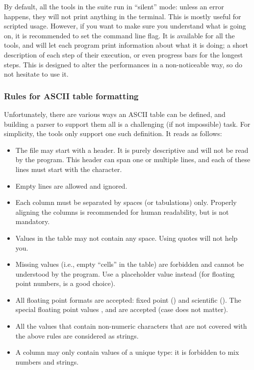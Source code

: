 By default, all the tools in the \egg suite run in ``silent'' mode: unless an error happens, they will not print anything in the terminal. This is mostly useful for scripted usage. However, if you want to make sure you understand what is going on, it is recommended to set the  command line flag. It is available for all the tools, and will let each program print information about what it is doing; a short description of each step of their execution, or even progress bars for the longest steps. This is designed to alter the performances in a non-noticeable way, so do not hesitate to use it.


\subsubsection{Rules for ASCII table formatting}

Unfortunately, there are various ways an ASCII table can be defined, and building a parser to support them all is a challenging (if not impossible) task. For simplicity, the \egg tools only support one such definition. It reads as follows:
\begin{itemize}
\item The file may start with a header. It is purely descriptive and will not be read by the program. This header can span one or multiple lines, and each of these lines must start with the  character.
\item Empty lines are allowed and ignored.
\item Each column must be separated by spaces (or tabulations) only. Properly aligning the columns is recommended for human readability, but is not mandatory.
\item Values in the table may not contain any space. Using quotes will not help you.
\item Missing values (i.e., empty ``cells'' in the table) are forbidden and cannot be understood by the program. Use a placeholder value instead (for floating point numbers,  is a good choice).
\item All floating point formats are accepted: fixed point () and scientific (). The special floating point values ,  and  are accepted (case does not matter).
\item All the values that contain non-numeric characters that are not covered with the above rules are considered as strings.
\item A column may only contain values of a unique type: it is forbidden to mix numbers and strings.
\end{itemize}


